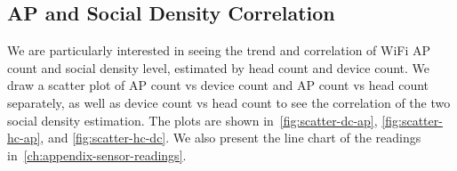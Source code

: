 







	\subsection{AP and Social Density Correlation} %
	\label{sub:ap_and_social_density_correlation}
	We are particularly interested in seeing the trend and correlation of WiFi \ac{AP} count and social density level, estimated by head count and device count. We draw a scatter plot of \ac{AP} count vs device count and \ac{AP} count vs head count separately, as well as device count vs head count to see the correlation of the two social density estimation. The plots are shown in~\autoref{fig:scatter-dc-ap}, \autoref{fig:scatter-hc-ap}, and \autoref{fig:scatter-hc-dc}. We also present the line chart of the readings in~\autoref{ch:appendix-sensor-readings}.

